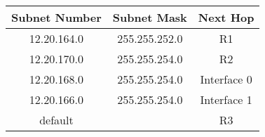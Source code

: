 \begin{tabular}{|c|c|c|}
\hline
Subnet Number & Subnet Mask & Next Hop \\
\hline
12.20.164.0 & 255.255.252.0 & R1 \\
12.20.170.0 & 255.255.254.0 & R2 \\
12.20.168.0 & 255.255.254.0 & Interface 0 \\
12.20.166.0 & 255.255.254.0 & Interface 1 \\
default &  & R3 \\
\hline
\end{tabular}